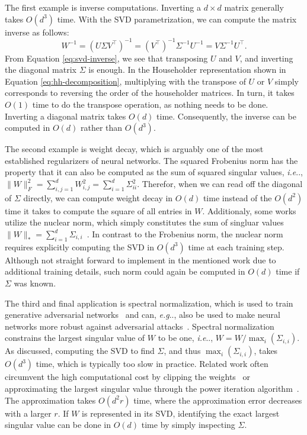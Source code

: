 \documentclass[11pt,a4paper,twoside,openright,final]{memoir}
\makeatletter
\DeclareRobustCommand\onedot{\futurelet\@let@token\@onedot}
\def\@onedot{\ifx\@let@token.\else.\null\fi\xspace}
\def\eg{\emph{e.g}\onedot} \def\Eg{\emph{E.g}\onedot}
\def\ie{\emph{i.e}\onedot} \def\Ie{\emph{I.e}\onedot}
\makeatother
\begin{document}
The first example is inverse computations. 
Inverting a $d\times d$ matrix generally takes $O(d^3)$ time.
With the SVD parametrization, we can compute the matrix inverse as follows:
\begin{equation}\label{eq:svd-inverse}
    W^{-1} = (U\Sigma V^\intercal)^{-1} = (V^\intercal)^{-1}\Sigma^{-1}U^{-1} = V \Sigma^{-1} U^\intercal.
\end{equation}
From Equation \eqref{eq:svd-inverse}, we see that transposing $U$ and $V$, and inverting the diagonal matrix $\Sigma$ is enough.
In the Householder representation shown in Equation \eqref{eq:hh-decomposition}, multiplying with the transpose of $U$ or $V$ simply corresponds to reversing the order of the householder matrices.
In turn, it takes $O(1)$ time to do the transpose operation, as nothing needs to be done. 
Inverting a diagonal matrix takes $O(d)$ time. 
Consequently, the inverse can be computed in $O(d)$ rather than $O(d^3)$.

The second example is weight decay, which is arguably one of the most established regularizers of neural networks.
The squared Frobenius norm  has the property that  it can also be computed as the sum of squared singular values, \ie, $\|W\|_F^2 = \sum_{i,j=1}^d W_{i,j}^2 = \sum_{i=1}^d \Sigma_{ii}^2$.
Therefor, when we can read off the diagonal of $\Sigma$ directly, we can compute weight decay in $O(d)$ time instead of the $O(d^2)$ time it takes to compute the square of all entries in $W$.
Additionaly, some works utilize the nuclear norm, which simply constitutes the sum of singluar values $\|W\|_\ast = \sum_{i=1}^d \Sigma_{i,i}$~\cite{nuclear-norm-regularizer, nuclear-norm-regularizer2}. 
In contrast to the Frobenius norm, the nuclear norm requires explicitly computing the SVD in $O(d^3)$ time at each training step.
Although not straight forward to implement in the mentioned work due to additional training details, such norm could again be computed in $O(d)$ time if $\Sigma$ was known. 

The third and final application is spectral normalization, which is used to train generative adversarial networks~\cite{sngan, wgan} and can, \eg, also be used to make neural networks more robust against adversarial attacks~\cite{spectral-norm-robustness}. 
Spectral normalization constrains the largest singular value of $W$ to be one, \ie, $W = W / \max_{i}(\Sigma_{i,i})$. 
As discussed, computing the SVD to find $\Sigma$, and thus $\max_i(\Sigma_{i,i})$, takes $O(d^3)$ time, which is typically too slow in practice.
Related work often circumvent the high computational cost by clipping the weights~\cite{wgan} or approximating the largest singular value through the power iteration algorithm~\cite{sngan, spectral-norm-robustness}.
The approximation takes $O(d^2r)$ time, where the approximation error decreases with a larger $r$.
If $W$ is represented in its SVD, identifying the exact largest singular value can be done in $O(d)$ time by simply inspecting $\Sigma$. 
\end{document}
